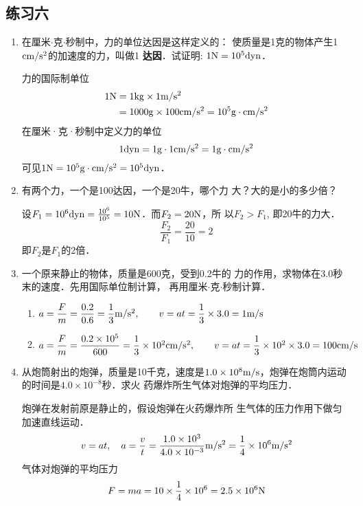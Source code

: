 \subsection{练习六}
\begin{enumerate}
\item 在厘米$\cdot$克$\cdot$秒制中，力的单位达因是这样定义的：
使质量是1克的物体产生1${\rm cm}/{\rm s^2}$的加速度的力，叫做1
\textbf{达因}．试证明: $1{\rm N}=10^5{\rm dyn}$．
	 
\begin{solution}
    力的国际制单位
\[\begin{split}
    1{\rm N}&=1{\rm kg}\times 1\text{m}/\text{s}^2\\
    &=1000{\rm g}\times 100{\rm cm/s^2}=10^5{\rm g\cdot cm/s^2}
\end{split}\]
在厘米·克·秒制中定义力的单位
\[1{\rm dyn}=1{\rm g}\cdot 1{\rm cm/s^2}=1{\rm g\cdot cm/s^2}\]
可见$1{\rm N}=10^5{\rm g\cdot cm/s^2}=10^5{\rm dyn}$．
\end{solution}
\item 有两个力，一个是100达因，一个是20牛，哪个力
大？大的是小的多少倍？
	 
\begin{solution}
    设$F_1=10^6{\rm dyn}=\frac{10^6}{10^5}=10{\rm N}$．而$F_2=20{\rm N}$，所
以$F_2>F_1$, 即20牛的力大．
\[\frac{F_2}{F_1}=\frac{20}{10}=2\]
即$F_2$是$F_1$的2倍．
\end{solution}
\item 一个原来静止的物体，质量是600克，受到0.2牛的
力的作用，求物体在3.0秒末的速度．先用国际单位制计算，
再用厘米$\cdot$克$\cdot$秒制计算．
	 
\begin{solution}
\begin{enumerate}
    \item $a=\dfrac{F}{m}=\dfrac{0.2}{0.6}=\dfrac{1}{3}\text{m}/\text{s}^2,\qquad v=at=\dfrac{1}{3}\times 3.0=1\text{m}/\text{s}$
\item $a=\dfrac{F}{m}=\dfrac{0.2\times 10^5}{600}=\dfrac{1}{3}\times 10^2{\rm cm/s^2},\qquad v=at=\dfrac{1}{3}\times 10^2\times 3.0=100{\rm cm/s}$
\end{enumerate}
\end{solution}
\item 从炮筒射出的炮弹，质量是10千克，速度是$1.0\times 
10^8\text{m}/\text{s}$，炮弹在炮筒内运动的时间是$4.0\times 10^{-8}$秒．求火
药爆炸所生气体对炮弹的平均压力．

\begin{solution}	 
    炮弹在发射前原是静止的，假设炮弹在火药爆炸所
    生气体的压力作用下做匀加速直线运动．
\[v=at,\quad a=\frac{v}{t}=\frac{1.0\times 10^3}{4.0\times 10^{-3}}\text{m}/\text{s}^2=\frac{1}{4}\times 10^6\text{m}/\text{s}^2\]
气体对炮弹的平均压力
\[F=ma=10\times\frac{1}{4}\times 10^6=2.5\times 10^6{\rm N}\]
\end{solution}
\end{enumerate}



